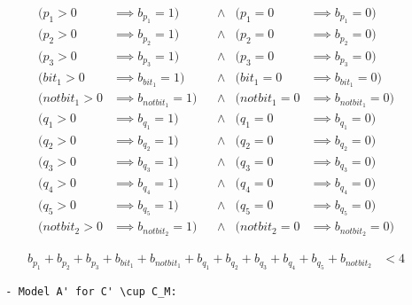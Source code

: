 \begin{align*}
(     p_1    > 0 & \implies b_{p_1}   = 1 ) & &\land &
(     p_1    = 0 & \implies b_{p_1}    = 0 ) \\
(     p_2    > 0 & \implies b_{p_2}    = 1 ) & &\land &
(     p_2    = 0 & \implies b_{p_2}    = 0 ) \\
(     p_3    > 0 & \implies b_{p_3}    = 1 ) & &\land &
(     p_3    = 0 & \implies b_{p_3}    = 0 ) \\
(     bit_1  > 0 & \implies b_{bit_1}  = 1 ) & &\land &
(     bit_1  = 0 & \implies b_{bit_1}  = 0 ) \\
( notbit_1 > 0 & \implies b_{notbit_1} = 1 ) & &\land &
( notbit_1 = 0 & \implies b_{notbit_1} = 0 ) \\
(     q_1    > 0 & \implies b_{q_1}    = 1 ) & &\land &
(     q_1    = 0 & \implies b_{q_1}    = 0 ) \\
(     q_2    > 0 & \implies b_{q_2}    = 1 ) & &\land &
(     q_2    = 0 & \implies b_{q_2}    = 0 ) \\
(     q_3    > 0 & \implies b_{q_3}    = 1 ) & &\land &
(     q_3    = 0 & \implies b_{q_3}    = 0 ) \\
(     q_4    > 0 & \implies b_{q_4}    = 1 ) & &\land &
(     q_4    = 0 & \implies b_{q_4}    = 0 ) \\
(     q_5    > 0 & \implies b_{q_5}    = 1 ) & &\land &
(     q_5    = 0 & \implies b_{q_5}    = 0 ) \\
( notbit_2 > 0 & \implies b_{notbit_2} = 1 ) & &\land &
( notbit_2 = 0 & \implies b_{notbit_2} = 0 )
\end{align*}

\begin{align*}
    b_{p_1} + b_{p_2} + b_{p_3} + b_{bit_1} + b_{notbit_1} +
    b_{q_1} + b_{q_2} + b_{q_3} + b_{q_4} + b_{q_5} + b_{notbit_2} & < 4
\end{align*}

\iffalse
\begin{verbatim}
    b_p1 + b_p2 + b_p3 + b_bit1 + b_nbit1 + b_q1 + b_q2 + b_q3 + b_q4 + b_q5
         + b_nbit2 < 4
    --------------   |
                |    |
                |    number of places appearing in current invariant for A'
                |    = #{s | A'(s) > 0} = #{p1, p2, p3, bit1}
                |
  number of places appearing in new invariant
\end{verbatim}
\fi
  
\begin{verbatim}
  - Model A' for C' \cup C_M:
\end{verbatim}

